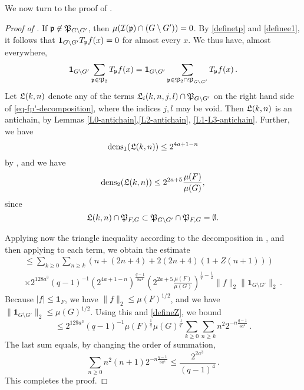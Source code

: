 We now turn to the proof of .
\begin{proof}[Proof of ]
    \leanok
    If ${\mathfrak p} \not\in {\mathfrak P}_{G \setminus G'}$, then $\mu({\mathcal{I}}({\mathfrak p}) \cap (G \setminus G')) = 0$. By \eqref{definetp} and \eqref{definee1}, it follows that
    $\mathbf{1}_{G \setminus G'} T_{{\mathfrak p}}f(x) = 0$ for almost every $x$. We thus have, almost everywhere,
    $$
        \mathbf{1}_{G\setminus G'} \sum_{{\mathfrak p} \in {\mathfrak P}_2} T_{{\mathfrak p}}f(x) = \mathbf{1}_{G\setminus G'} \sum_{{\mathfrak p} \in {\mathfrak P}_2 \cap {\mathfrak P}_{G \setminus G'}} T_{{\mathfrak p}}f(x)\,.
    $$
    Let ${\mathfrak L}(k,n)$ denote any of the terms ${\mathfrak L}_i(k,n,j,l) \cap {\mathfrak P}_{G \setminus G'}$ on the right hand side of \eqref{eq-fp'-decomposition}, where the indices $j, l$ may be void. Then ${\mathfrak L}(k,n)$ is an antichain, by Lemmas \ref{L0-antichain},\ref{L2-antichain}, \ref{L1-L3-antichain}. Further, we have
    \begin{equation*}
    \operatorname{\operatorname{dens}}_1({\mathfrak L}(k,n)) \le 2^{4a+1 - n}
    \end{equation*}
    by , and we have
    \begin{equation*}
     \operatorname{\operatorname{dens}}_2({\mathfrak L}(k,n)) \le 2^{2a+5} \frac{\mu(F)}{\mu(G)},
     \end{equation*}
     since
     \begin{equation*}
     {\mathfrak L}(k,n) \cap {\mathfrak P}_{F,G} \subset {\mathfrak P}_{G \setminus G'} \cap {\mathfrak P}_{F, G} = \emptyset.
     \end{equation*}

    Applying now the triangle inequality according to the decomposition in , and then applying  to each term, we obtain the estimate
    \begin{multline*}
        \le \sum_{k \ge 0} \sum_{n \ge k} (n + (2n+4) + 2(2n+4) (1+Z(n+1))) \\
        \times 2^{128a^3}(q-1)^{-1} (2^{4a+1-n})^{\frac{q-1}{8a^4}} (2^{2a+5} \frac{\mu(F)}{\mu(G)})^{\frac{1}{q} - \frac{1}{2}} \|f\|_2\|\mathbf{1}_{G\setminus G'}\|_2\,.
    \end{multline*}
    Because $|f| \le \mathbf{1}_F$, we have $\|f\|_2 \le \mu(F)^{1/2}$, and we have $\|\mathbf{1}_{G\setminus G'}\|_2 \le \mu(G)^{1/2}$. Using this and \eqref{defineZ}, we bound
    $$
        \le 2^{129a^3} (q - 1)^{-1} \mu(F)^{\frac{1}{q}} \mu(G)^{\frac{1}{q'}} \sum_{k \ge 0} \sum_{n \ge k} n^2 2^{-n\frac{q-1}{8a^4}}\,.
    $$
    The last sum equals, by changing the order of summation,
    $$
        \sum_{n \ge 0} n^2(n+1) 2^{-n\frac{q-1}{8a^4}} \le \frac{2^{2a^3}}{(q-1)^4}\,.
    $$
    This completes the proof.
\end{proof}

